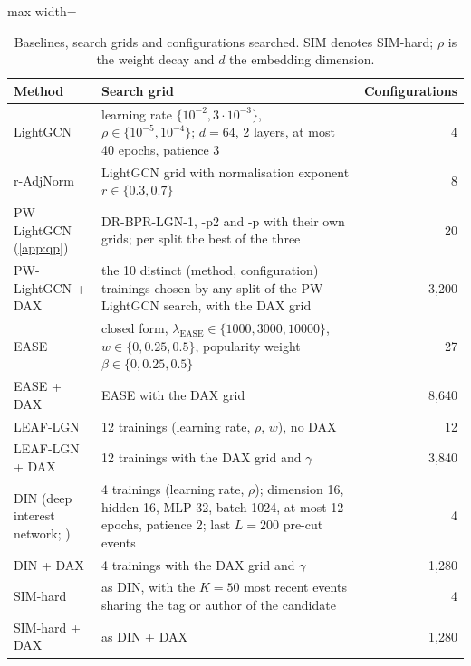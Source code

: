 \begin{table}[t]
\centering
\caption{Baselines, search grids and configurations searched. SIM denotes SIM-hard; $\rho$ is the weight decay and $d$ the embedding dimension.}
\label{tab:baselines}
\footnotesize
\begin{adjustbox}{max width=\textwidth}
\begin{tabular}{p{}p{}r}
\toprule
Method & Search grid & Configurations \\
\midrule
\raggedright LightGCN \citep{he2020lightgcn} & \raggedright learning rate $\{10^{-2},3\cdot10^{-3}\}$, $\rho\in\{10^{-5},10^{-4}\}$; $d=64$, 2 layers, at most 40 epochs, patience 3 & 4 \\
\raggedright r-AdjNorm \citep{zhao2022radjnorm} & \raggedright LightGCN grid with normalisation exponent $r\in\{0.3,0.7\}$ & 8 \\
\raggedright PW-LightGCN (\ref{app:qp}) & \raggedright DR-BPR-LGN-1, -p2 and -p with their own grids; per split the best of the three & 20 \\
\raggedright PW-LightGCN + DAX & \raggedright the 10 distinct (method, configuration) trainings chosen by any split of the PW-LightGCN search, with the DAX grid & 3,200 \\
\raggedright EASE \citep{steck2019ease} & \raggedright closed form, $\lambda_{\mathrm{EASE}}\in\{1000,3000,10000\}$, $w\in\{0,0.25,0.5\}$, popularity weight $\beta\in\{0,0.25,0.5\}$ & 27 \\
\raggedright EASE + DAX & \raggedright EASE with the DAX grid & 8,640 \\
\raggedright LEAF-LGN & \raggedright 12 trainings (learning rate, $\rho$, $w$), no DAX & 12 \\
\raggedright LEAF-LGN + DAX & \raggedright 12 trainings with the DAX grid and $\gamma$ & 3,840 \\
\raggedright DIN (deep interest network; \citealp{zhou2018din}) & \raggedright 4 trainings (learning rate, $\rho$); dimension 16, hidden 16, MLP 32, batch 1024, at most 12 epochs, patience 2; last $L=200$ pre-cut events & 4 \\
\raggedright DIN + DAX & \raggedright 4 trainings with the DAX grid and $\gamma$ & 1,280 \\
\raggedright SIM-hard \citep{pi2020sim} & \raggedright as DIN, with the $K=50$ most recent events sharing the tag or author of the candidate & 4 \\
\raggedright SIM-hard + DAX & \raggedright as DIN + DAX & 1,280 \\

\end{tabular}
\end{adjustbox}
\end{table}
